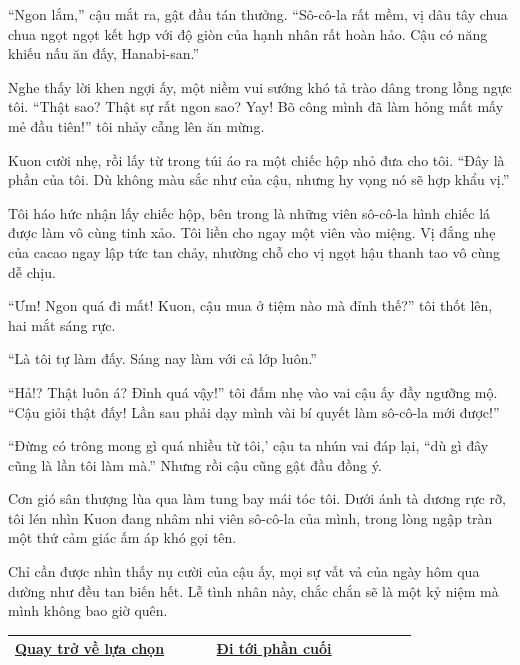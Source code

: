 \documentclass[../main.tex]{subfiles}
\begin{document}
``Ngon lắm,'' cậu mắt ra, gật đầu tán thưởng. ``Sô-cô-la rất mềm, vị dâu tây chua chua ngọt ngọt kết hợp với độ giòn của hạnh nhân rất hoàn hảo. Cậu có năng khiếu nấu ăn đấy, Hanabi-san.''

Nghe thấy lời khen ngợi ấy, một niềm vui sướng khó tả trào dâng trong lồng ngực tôi. ``Thật sao? Thật sự rất ngon sao? Yay! Bõ công mình đã làm hỏng mất mấy mẻ đầu tiên!'' tôi nhảy cẫng lên ăn mừng.

Kuon cười nhẹ, rồi lấy từ trong túi áo ra một chiếc hộp nhỏ đưa cho tôi. ``Đây là phần của tôi. Dù không màu sắc như của cậu, nhưng hy vọng nó sẽ hợp khẩu vị.''

Tôi háo hức nhận lấy chiếc hộp, bên trong là những viên sô-cô-la hình chiếc lá được làm vô cùng tinh xảo. Tôi liền cho ngay một viên vào miệng. Vị đắng nhẹ của cacao ngay lập tức tan chảy, nhường chỗ cho vị ngọt hậu thanh tao vô cùng dễ chịu.

``Ưm! Ngon quá đi mất! Kuon, cậu mua ở tiệm nào mà đỉnh thế?'' tôi thốt lên, hai mắt sáng rực.

``Là tôi tự làm đấy. Sáng nay làm với cả lớp luôn.''

``Hả!? Thật luôn á? Đỉnh quá vậy!'' tôi đấm nhẹ vào vai cậu ấy đầy ngưỡng mộ. ``Cậu giỏi thật đấy! Lần sau phải dạy mình vài bí quyết làm sô-cô-la mới được!''

``Đừng có trông mong gì quá nhiều từ tôi,' cậu ta nhún vai đáp lại, ``dù gì đây cũng là lần tôi làm mà.'' Nhưng rồi cậu cũng gật đầu đồng ý.

Cơn gió sân thượng lùa qua làm tung bay mái tóc tôi. Dưới ánh tà dương rực rỡ, tôi lén nhìn Kuon đang nhâm nhi viên sô-cô-la của mình, trong lòng ngập tràn một thứ cảm giác ấm áp khó gọi tên.

Chỉ cần được nhìn thấy nụ cười của cậu ấy, mọi sự vất vả của ngày hôm qua dường như đều tan biến hết. Lễ tình nhân này, chắc chắn sẽ là một kỷ niệm mà mình không bao giờ quên.

\begin{table}[H]
  \centering
  \setlength{\arrayrulewidth}{1pt}
  \begin{tabular}{|>{\centering\arraybackslash}p{0.4\linewidth}|>{\centering\arraybackslash}p{0.4\linewidth}|}
    \hline
    \hyperref[choice]{Quay trở về lựa chọn} & \hyperref[ending]{Đi tới phần cuối} \\ \hline
  \end{tabular}
\end{table}

\newpage
\label{touka}
\end{document}
